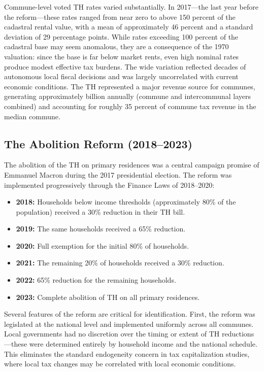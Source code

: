 \documentclass[12pt]{article}
\begin{document}
Commune-level voted TH rates varied substantially. In 2017---the last year before the reform---these rates ranged from near zero to above 150 percent of the cadastral rental value, with a mean of approximately 46 percent and a standard deviation of 29 percentage points. While rates exceeding 100 percent of the cadastral base may seem anomalous, they are a consequence of the 1970 valuation: since the base is far below market rents, even high nominal rates produce modest effective tax burdens. The wide variation reflected decades of autonomous local fiscal decisions and was largely uncorrelated with current economic conditions. The TH represented a major revenue source for communes, generating approximately  billion annually (commune and intercommunal layers combined) and accounting for roughly 35 percent of commune tax revenue in the median commune.

\subsection{The Abolition Reform (2018--2023)}

The abolition of the TH on primary residences was a central campaign promise of Emmanuel Macron during the 2017 presidential election. The reform was implemented progressively through the Finance Laws of 2018--2020:

\begin{itemize}
    \item \textbf{2018:} Households below income thresholds (approximately 80\% of the population) received a 30\% reduction in their TH bill.
    \item \textbf{2019:} The same households received a 65\% reduction.
    \item \textbf{2020:} Full exemption for the initial 80\% of households.
    \item \textbf{2021:} The remaining 20\% of households received a 30\% reduction.
    \item \textbf{2022:} 65\% reduction for the remaining households.
    \item \textbf{2023:} Complete abolition of TH on all primary residences.
\end{itemize}

Several features of the reform are critical for identification. First, the reform was legislated at the national level and implemented uniformly across all communes. Local governments had no discretion over the timing or extent of TH reductions---these were determined entirely by household income and the national schedule. This eliminates the standard endogeneity concern in tax capitalization studies, where local tax changes may be correlated with local economic conditions.
\end{document}
